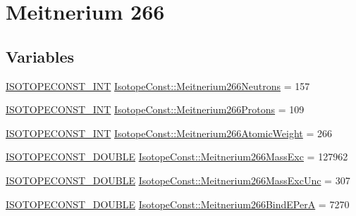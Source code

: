 \hypertarget{group___isotope_const-_meitnerium-_mt266}{}\section{Meitnerium 266}
\label{group___isotope_const-_meitnerium-_mt266}
\subsection*{Variables}
\begin{DoxyCompactItemize}
\item 
\mbox{\hyperlink{group___isotope_const-_macros_ga5f18360b3e99483a35c32d789e62621c}{I\+S\+O\+T\+O\+P\+E\+C\+O\+N\+S\+T\+\_\+\+I\+NT}} \mbox{\hyperlink{group___isotope_const-_meitnerium-_mt266_gaa2b44880a2f8d8ca87666c91686f6d3c}{Isotope\+Const\+::\+Meitnerium266\+Neutrons}} = 157
\item 
\mbox{\hyperlink{group___isotope_const-_macros_ga5f18360b3e99483a35c32d789e62621c}{I\+S\+O\+T\+O\+P\+E\+C\+O\+N\+S\+T\+\_\+\+I\+NT}} \mbox{\hyperlink{group___isotope_const-_meitnerium-_mt266_gacafa1efd74e1739bc86447b781e2a0dc}{Isotope\+Const\+::\+Meitnerium266\+Protons}} = 109
\item 
\mbox{\hyperlink{group___isotope_const-_macros_ga5f18360b3e99483a35c32d789e62621c}{I\+S\+O\+T\+O\+P\+E\+C\+O\+N\+S\+T\+\_\+\+I\+NT}} \mbox{\hyperlink{group___isotope_const-_meitnerium-_mt266_ga619b650ad149363bdaa73748e501ba0f}{Isotope\+Const\+::\+Meitnerium266\+Atomic\+Weight}} = 266
\item 
\mbox{\hyperlink{group___isotope_const-_macros_ga8f45a7272ce02c0b4c65c44636ed719a}{I\+S\+O\+T\+O\+P\+E\+C\+O\+N\+S\+T\+\_\+\+D\+O\+U\+B\+LE}} \mbox{\hyperlink{group___isotope_const-_meitnerium-_mt266_ga1e1467c6e1d0a55473411757b7eb7a89}{Isotope\+Const\+::\+Meitnerium266\+Mass\+Exc}} = 127962
\item 
\mbox{\hyperlink{group___isotope_const-_macros_ga8f45a7272ce02c0b4c65c44636ed719a}{I\+S\+O\+T\+O\+P\+E\+C\+O\+N\+S\+T\+\_\+\+D\+O\+U\+B\+LE}} \mbox{\hyperlink{group___isotope_const-_meitnerium-_mt266_ga5282ef74fd745009ced7e477737e001d}{Isotope\+Const\+::\+Meitnerium266\+Mass\+Exc\+Unc}} = 307
\item 
\mbox{\hyperlink{group___isotope_const-_macros_ga8f45a7272ce02c0b4c65c44636ed719a}{I\+S\+O\+T\+O\+P\+E\+C\+O\+N\+S\+T\+\_\+\+D\+O\+U\+B\+LE}} \mbox{\hyperlink{group___isotope_const-_meitnerium-_mt266_ga136b7aa1f4bfb9b56ca43dd54e5da6df}{Isotope\+Const\+::\+Meitnerium266\+Bind\+E\+PerA}} = 7270
\item 

\end{DoxyCompactItemize}
